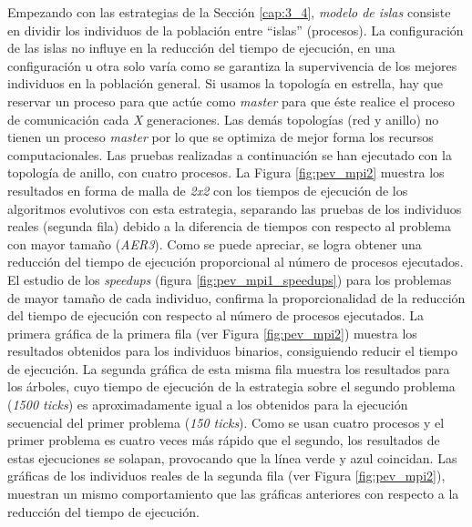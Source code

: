 		Empezando con las estrategias de la Sección \ref{cap:3_4}, \textit{modelo de islas} consiste en dividir los individuos de la población entre ``islas'' (procesos). La configuración de las islas no influye en la reducción del tiempo de ejecución, en una configuración u otra solo varía como se garantiza la supervivencia de los mejores individuos en la población general. Si usamos la topología en estrella, hay que reservar un proceso para que actúe como \textit{master} para que éste realice el proceso de comunicación cada \textit{X} generaciones. Las demás topologías (red y anillo) no tienen un proceso \textit{master} por lo que se optimiza de mejor forma los recursos computacionales. Las pruebas realizadas a continuación se han ejecutado con la topología de anillo, con cuatro procesos. La Figura \ref{fig:pev_mpi2} muestra los resultados en forma de malla de \textit{2x2} con los tiempos de ejecución de los algoritmos evolutivos con esta estrategia, separando las pruebas de los individuos reales (segunda fila) debido a la diferencia de tiempos con respecto al problema con mayor tamaño (\textit{AER3}). Como se puede apreciar, se logra obtener una reducción del tiempo de ejecución proporcional al número de procesos ejecutados. El estudio de los \textit{speedups} (figura \ref{fig:pev_mpi1_speedups}) para los problemas de mayor tamaño de cada individuo, confirma la proporcionalidad de la reducción del tiempo de ejecución con respecto al número de procesos ejecutados. La primera gráfica de la primera fila (ver Figura \ref{fig:pev_mpi2}) muestra los resultados obtenidos para los individuos binarios, consiguiendo reducir el tiempo de ejecución. La segunda gráfica de esta misma fila muestra los resultados para los árboles, cuyo tiempo de ejecución de la estrategia sobre el segundo problema (\textit{1500 ticks}) es aproximadamente igual a los obtenidos para la ejecución secuencial del primer problema (\textit{150 ticks}). Como se usan cuatro procesos y el primer problema es cuatro veces más rápido que el segundo, los resultados de estas ejecuciones se solapan, provocando que la línea verde y azul coincidan. Las gráficas de los individuos reales de la segunda fila (ver Figura \ref{fig:pev_mpi2}), muestran un mismo comportamiento que las gráficas anteriores con respecto a la reducción del tiempo de ejecución.
		
		
			
